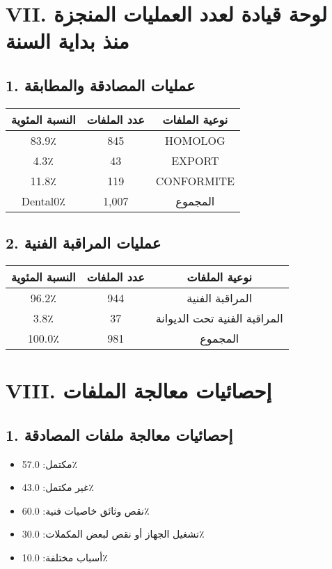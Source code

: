 \documentclass[a4paper,12pt]{article}
\begin{document}
\section*{VII. لوحة قيادة لعدد العمليات المنجزة منذ بداية السنة}
\subsection*{1. عمليات المصادقة والمطابقة}
\begin{tabular}{ccc}
\toprule
\textbf{النسبة المئوية} & \textbf{عدد الملفات} & \textbf{نوعية الملفات} \\
\midrule
83.9٪ & 845 & HOMOLOG \\
4.3٪ & 43 & EXPORT \\
11.8٪ & 119 & CONFORMITE \\
 Dental0٪ & 1,007 & المجموع \\

\bottomrule
\end{tabular}

\subsection*{2. عمليات المراقبة الفنية}
\begin{tabular}{ccc}
\toprule
\textbf{النسبة المئوية} & \textbf{عدد الملفات} & \textbf{نوعية الملفات} \\
\midrule
96.2٪ & 944 & المراقبة الفنية \\
3.8٪ & 37 & المراقبة الفنية تحت الديوانة \\
100.0٪ & 981 & المجموع \\

\bottomrule
\end{tabular}

\section*{VIII. إحصائيات معالجة الملفات}
\subsection*{1. إحصائيات معالجة ملفات المصادقة}
\begin{itemize}
    \item مكتمل: 57.0٪
    \item غير مكتمل: 43.0٪
\end{itemize}
\begin{itemize}
    \item نقص وثائق خاصيات فنية: 60.0٪
    \item تشغيل الجهاز أو نقص لبعض المكملات: 30.0٪
    \item أسباب مختلفة: 10.0٪
\end{itemize}
\end{document}
